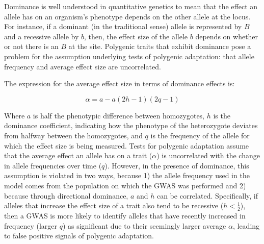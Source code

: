 \documentclass[a4paper,10pt]{article}
\begin{document}
\begin{comment}
  Ok, this is getting close, but I think there are still a couple things to unwind here.
  The second equation below is not really a feature of tests of polygenic adaptation, but rather is just a fact about the way that the average effect size depends on the difference between homozygotes, dominance, and the current allele frequency in the population. Above, you've already motivated the fact that tests of polygenic adaptation assume independence of the average effect and patterns of change in allele frequency. Now I think before you get to equation 2 you want to introduce the idea of dominance (you haven't done that up to this point), i.e. when the effect of an allele on a phentoype depends on the identity of the other allele at that site, and then you can say that the presence of dominance violates this assumption of independence between allele frequency and average effect. Then show the equation and explain what the individual pieces are.
  \end{comment}


Dominance is well understood in quantitative genetics to mean that the
effect an allele has on an organism's phenotype depends on the other
allele at the locus. For instance, if a dominant (in the traditional
sense) allele is represented by $B$ and a recessive allele by $b$,
then, the effect size of the allele $b$ depends on whether or not
there is an $B$ at the site. Polygenic traits that exhibit dominance
pose a problem for the assumption underlying tests of polygenic
adaptation: that allele frequency and average effect size
are uncorrelated. 

The expression for the average effect size in terms of dominance
effects is:

\begin{equation}
  \alpha = a - a(2h - 1)(2q - 1)
\end{equation}

Where $a$ is half the phenotypic difference between homozygotes, $h$ is the
dominance coefficient, indicating how the phenotype of the heterozygote deviates from halfway between the homozygotes, and $q$ is the frequency of the allele for which
the effect size is being measured. Tests for polygenic adaptation
assume that the average effect an allele has on a trait ($\alpha$) is
uncorrelated with the change in allele frequencies over time
($q$). However, in the presence of dominance, this assumption is violated in two ways, because 1)
the allele frequency used in the model comes from the population on
which the GWAS was performed and 2) because through directional
dominance, $a$ and $h$ can be correlated. Specifically, if alleles that
increase the effect size of a trait also tend to be recessive
($h<\frac{1}{2}$), then a GWAS is more likely to identify alleles that have
recently increased in frequency (larger $q$) as significant due to
their seemingly larger average $\alpha$, leading to false
positive signals of polygenic adaptation.
\end{document}
